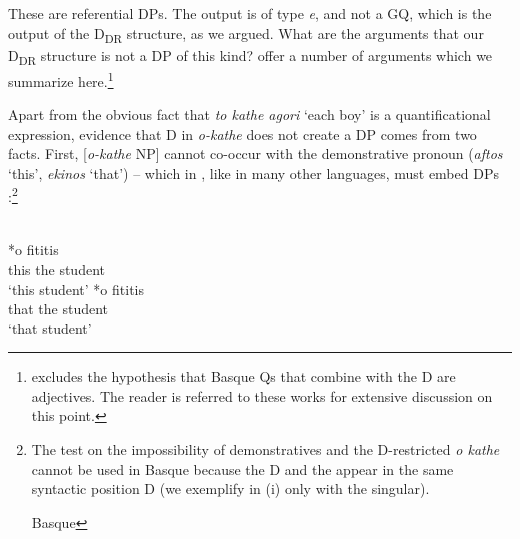 \documentclass[output=paper,
modfonts
]{langscibook}
\begin{document}
These are referential DPs. The output is of type \textit{e}, and not a GQ, which is the output of the D\textsubscript{DR} structure, as we argued. What are the arguments that our D\textsubscript{DR} structure is not a DP of this kind? \citet{etxeberria-giannakidou2014} offer a number of arguments which we summarize here.\footnote{\citet{etxeberria2005, etxeberria2009} excludes the hypothesis that Basque Qs that combine with the D are adjectives. The reader is referred to these works for extensive discussion on this point.}

Apart from the obvious fact that \textit{to kathe agori} `each boy' is a quantificational expression, evidence that D in \textit{o-kathe} does not create a DP comes from two facts. First, [\textit{o-kathe} NP] cannot co-occur with the demonstrative pronoun (\textit{aftos} `this', \textit{ekinos} `that') -- which in , like in many other languages, must embed DPs \citep{stavrou1983, stavrou-horrocks1989, AlexiadouEtAlii2008}:\footnote{The  test on the impossibility of demonstratives and the D-restricted \textit{o kathe}  cannot be used in Basque because the D and the  appear in the same syntactic position D (we exemplify in (i) only with the singular). \newpage 

\ea \label{ex:etxeberria:i} \textnormal{Basque}
	\z
\z} \newpage 

\ea\label{ex:etxeberria:25} \\
\ea
{} \textnormal{*}{\op}{o}{\cp} {fititis}\\
this \phantom{*(}the student\\
\glt `this student'
\ex
{} \textnormal{*}{\op}{o}{\cp} {fititis}\\
that \phantom{*(}the student\\
\glt `that student'
\z
\z
\end{document}
